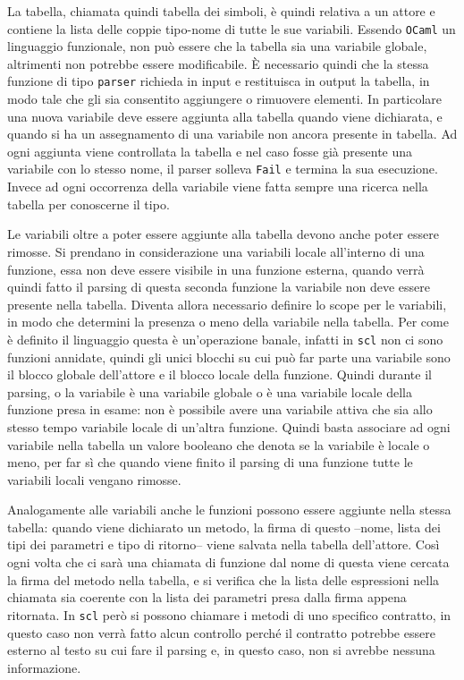 \documentclass[]{article}
\begin{document}
La tabella, chiamata quindi tabella dei simboli, è quindi relativa a un
attore e contiene la lista delle coppie tipo-nome di tutte le sue
variabili. Essendo \texttt{OCaml} un linguaggio funzionale, non può
essere che la tabella sia una variabile globale, altrimenti non potrebbe
essere modificabile. È necessario quindi che la stessa funzione di tipo
\texttt{parser} richieda in input e restituisca in output la tabella, in
modo tale che gli sia consentito aggiungere o rimuovere elementi. In
particolare una nuova variabile deve essere aggiunta alla tabella quando
viene dichiarata, e quando si ha un assegnamento di una variabile non
ancora presente in tabella. Ad ogni aggiunta viene controllata la
tabella e nel caso fosse già presente una variabile con lo stesso nome,
il parser solleva \texttt{Fail} e termina la sua esecuzione. Invece ad
ogni occorrenza della variabile viene fatta sempre una ricerca nella
tabella per conoscerne il tipo.

Le variabili oltre a poter essere aggiunte alla tabella devono anche
poter essere rimosse. Si prendano in considerazione una variabili locale
all'interno di una funzione, essa non deve essere visibile in una
funzione esterna, quando verrà quindi fatto il parsing di questa seconda
funzione la variabile non deve essere presente nella tabella. Diventa
allora necessario definire lo scope per le variabili, in modo che
determini la presenza o meno della variabile nella tabella. Per come è
definito il linguaggio questa è un'operazione banale, infatti in
\texttt{scl} non ci sono funzioni annidate, quindi gli unici blocchi su
cui può far parte una variabile sono il blocco globale dell'attore e il
blocco locale della funzione. Quindi durante il parsing, o la variabile
è una variabile globale o è una variabile locale della funzione presa in
esame: non è possibile avere una variabile attiva che sia allo stesso
tempo variabile locale di un'altra funzione. Quindi basta associare ad
ogni variabile nella tabella un valore booleano che denota se la
variabile è locale o meno, per far sì che quando viene finito il parsing
di una funzione tutte le variabili locali vengano rimosse.

Analogamente alle variabili anche le funzioni possono essere aggiunte
nella stessa tabella: quando viene dichiarato un metodo, la firma di
questo --nome, lista dei tipi dei parametri e tipo di ritorno-- viene
salvata nella tabella dell'attore. Così ogni volta che ci sarà una
chiamata di funzione dal nome di questa viene cercata la firma del
metodo nella tabella, e si verifica che la lista delle espressioni nella
chiamata sia coerente con la lista dei parametri presa dalla firma
appena ritornata. In \texttt{scl} però si possono chiamare i metodi di
uno specifico contratto, in questo caso non verrà fatto alcun controllo
perché il contratto potrebbe essere esterno al testo su cui fare il
parsing e, in questo caso, non si avrebbe nessuna informazione.
\end{document}
